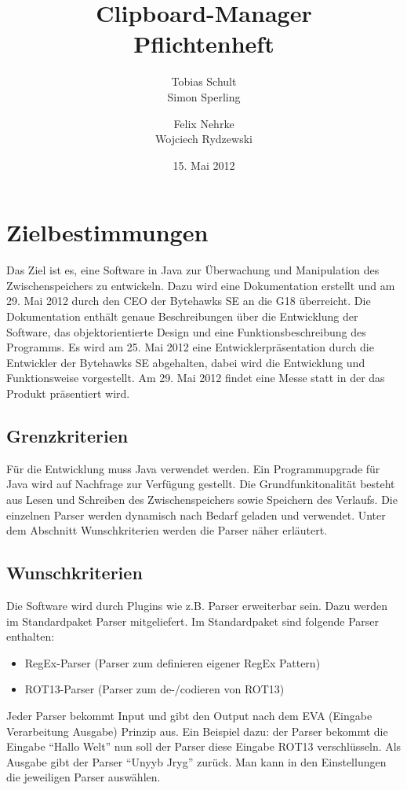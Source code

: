 \documentclass[a4paper,11pt,abstracton,titlepage]{scrartcl}
\title{Clipboard-Manager\\Pflichtenheft}
\author{Tobias Schult \\  Simon Sperling \and  Felix Nehrke \\  Wojciech
Rydzewski}
\date{15. Mai 2012}
\begin{document}
\maketitle

\tableofcontents
\thispagestyle{empty}
\newpage
\setlength{\parskip}{1em}
\setcounter{page}{1}


\section{Zielbestimmungen} 
Das Ziel ist es, eine Software in Java zur Überwachung und Manipulation des
Zwischenspeichers zu entwickeln.  Dazu wird eine Dokumentation erstellt und am
29. Mai 2012 durch den CEO der Bytehawks SE an die G18 überreicht.  Die
Dokumentation enthält genaue Beschreibungen über die Entwicklung der Software,
das objektorientierte Design und eine Funktionsbeschreibung des Programms.  Es
wird am 25. Mai 2012 eine Entwicklerpräsentation durch die Entwickler der
Bytehawks SE abgehalten, dabei wird die Entwicklung und Funktionsweise
vorgestellt. Am 29. Mai 2012 findet eine Messe statt in der das Produkt
präsentiert wird.

\subsection{Grenzkriterien} 
Für die Entwicklung muss Java verwendet werden. Ein
Programmupgrade für Java  wird auf Nachfrage zur Verfügung
gestellt.  Die Grundfunkitonalität besteht aus Lesen und Schreiben des
Zwischenspeichers sowie Speichern des Verlaufs.  Die einzelnen Parser werden
dynamisch nach Bedarf geladen und verwendet.  Unter dem Abschnitt
Wunschkriterien werden die Parser näher erläutert.  

\subsection{Wunschkriterien}
Die Software wird durch Plugins wie z.B. Parser erweiterbar sein. Dazu werden
im Standardpaket Parser mitgeliefert. Im Standardpaket sind folgende Parser
enthalten: \newline \begin{itemize} \item RegEx-Parser (Parser zum definieren
eigener RegEx Pattern) \item ROT13-Parser (Parser zum de-/codieren von ROT13)
\end{itemize} \newline Jeder Parser bekommt Input und gibt den Output nach dem
EVA (Eingabe Verarbeitung Ausgabe) Prinzip aus. Ein Beispiel dazu: der Parser
bekommt die Eingabe "`Hallo Welt"' nun soll der Parser diese Eingabe ROT13
verschlüsseln.  Als Ausgabe gibt der Parser "`Unyyb Jryg"' zurück.  Man kann in
den Einstellungen die jeweiligen Parser auswählen.
\end{document}
